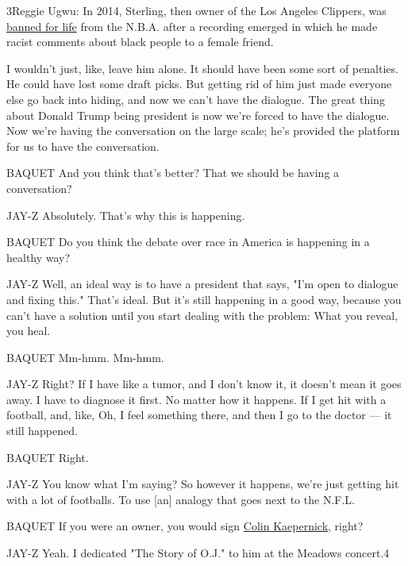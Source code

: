 3Reggie Ugwu: In 2014, Sterling, then owner of the Los Angeles Clippers,
was
\href{https://www.nytimes3xbfgragh.onion/2014/04/30/sports/basketball/nba-donald-sterling-los-angeles-clippers.html}{banned
for life} from the N.B.A. after a recording emerged in which he made
racist comments about black people to a female friend.

I wouldn't just, like, leave him alone. It should have been some sort of
penalties. He could have lost some draft picks. But getting rid of him
just made everyone else go back into hiding, and now we can't have the
dialogue. The great thing about Donald Trump being president is now
we're forced to have the dialogue. Now we're having the conversation on
the large scale; he's provided the platform for us to have the
conversation.

BAQUET And you think that's better? That we should be having a
conversation?

JAY-Z Absolutely. That's why this is happening.

BAQUET Do you think the debate over race in America is happening in a
healthy way?

JAY-Z Well, an ideal way is to have a president that says, "I'm open to
dialogue and fixing this." That's ideal. But it's still happening in a
good way, because you can't have a solution until you start dealing with
the problem: What you reveal, you heal.

BAQUET Mm-hmm. Mm-hmm.

JAY-Z Right? If I have like a tumor, and I don't know it, it doesn't
mean it goes away. I have to diagnose it first. No matter how it
happens. If I get hit with a football, and, like, Oh, I feel something
there, and then I go to the doctor --- it still happened.

BAQUET Right.

JAY-Z You know what I'm saying? So however it happens, we're just
getting hit with a lot of footballs. To use {[}an{]} analogy that goes
next to the N.F.L.

BAQUET If you were an owner, you would sign
\href{https://www.nytimes3xbfgragh.onion/2017/09/07/sports/colin-kaepernick-nfl-protests.html}{Colin
Kaepernick}, right?

JAY-Z Yeah. I dedicated "The Story of O.J." to him at the Meadows
concert.4

